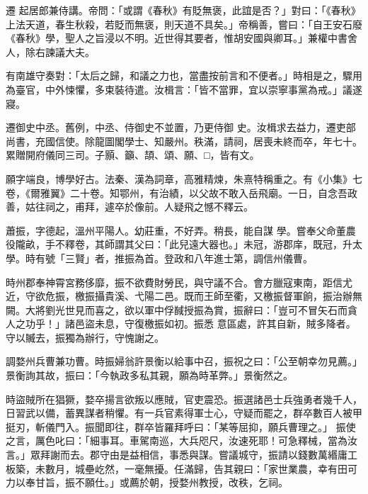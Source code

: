 \begin{pinyinscope}
 遷
 起居郎兼侍講。帝問：「或謂《春秋》有貶無褒，此誼是否？」對曰：「《春秋》上法天道，春生秋殺，若貶而無褒，則天道不具矣。」帝稱善，嘗曰：「自王安石廢《春秋》學，聖人之旨浸以不明。近世得其要者，惟胡安國與卿耳。」兼權中書舍人，除右諫議大夫。



 有南雄守奏對：「太后之歸，和議之力也，當盡按前言和不便者。」時相是之，驟用為臺官，中外悚懼，多束裝待遣。汝楫言：「皆不當罪，宜以崇寧事黨為戒。」議遂寢。



 遷御史中丞。舊例，中丞、侍御史不並置，乃更侍御
 史。汝楫求去益力，遷吏部尚書，充國信使。除龍圖閣學士、知嚴州。秩滿，請祠，居喪未終而卒，年七十。累贈開府儀同三司。子顥、籲、頡、頌、願、□，皆有文。



 願字端良，博學好古。法秦、漢為詞章，高雅精煉，朱熹特稱重之。有《小集》七卷，《爾雅翼》二十卷。知鄂州，有治績，以父故不敢入岳飛廟。一日，自念吾政善，姑往祠之，甫拜，遽卒於像前。人疑飛之憾不釋云。



 蕭振，字德起，溫州平陽人。幼莊重，不好弄。稍長，能自謀
 學。嘗奉父命董農役隴畝，手不釋卷，其師謂其父曰：「此兒遠大器也。」未冠，游郡庠，既冠，升太學。時有號「三賢」者，推振為首。登政和八年進士第，調信州儀曹。



 時州郡奉神霄宮務侈靡，振不欲費財勞民，與守議不合。會方臘寇東南，距信尤近，守欲危振，檄振攝貴溪、弋陽二邑。既而王師至衢，又檄振督軍餉，振治辦無闕。大將劉光世見而喜之，欲以軍中俘馘授振為賞，振辭曰：「豈可不冒矢石而貪人之功乎！」諸邑盜未息，守復檄振如初。振悉
 意區處，許其自新，賊多降者。守以贓去，振獨為辦行，守愧謝之。



 調婺州兵曹兼功曹。時振婦翁許景衡以給事中召，振祝之曰：「公至朝幸勿見薦。」景衡詢其故，振曰：「今執政多私其親，願為時革弊。」景衡然之。



 時盜賊所在猖獗，婺卒揚言欲叛以應賊，官吏震恐。振選諸邑士兵強勇者幾千人，日習武以備，蓄異謀者稍懼。有一兵官素得軍士心，守疑而罷之，群卒數百人被甲挺刃，斬儀門入。振聞即往，群卒皆羅拜呼曰：「某等屈抑，願兵曹理之。」
 振使之言，厲色叱曰：「細事耳。車駕南巡，大兵咫尺，汝速死耶！可急釋械，當為汝言。」眾拜謝而去。郡守由是益相信，事悉與謀。嘗議城守，振請以錢數萬緡庸工板築，未數月，城壘屹然，一毫無擾。任滿歸，告其親曰：「家世業農，幸有田可力以奉甘旨，振不願仕。」或薦於朝，授婺州教授，改秩，乞祠。




\end{pinyinscope}
